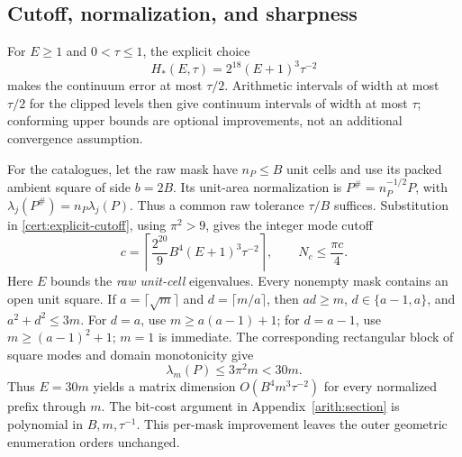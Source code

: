 \documentclass[11pt,reqno]{amsart}
\numberwithin{equation}{section}
\begin{document}
\subsection{Cutoff, normalization, and sharpness}
\label{cert:cutoff}

For $E\ge1$ and $0<\tau\le1$, the explicit choice
\begin{equation}\label{cert:explicit-cutoff}
 H_*(E,\tau)=2^{18}(E+1)^3\tau^{-2}
\end{equation}
makes the continuum error at most $\tau/2$.  Arithmetic intervals
of width at most $\tau/2$ for the clipped levels then give
continuum intervals of width at most $\tau$; conforming upper
bounds are optional improvements, not an additional convergence
assumption.

For the catalogues, let the raw mask have $n_P\le B$ unit cells
and use its packed ambient square of side $b=2B$.  Its unit-area
normalization is $P^\#=n_P^{-1/2}P$, with
$\lambda_j(P^\#)=n_P\lambda_j(P)$.  Thus a common raw tolerance
$\tau/B$ suffices.  Substitution in
\eqref{cert:explicit-cutoff}, using $\pi^2>9$, gives the integer
mode cutoff
\begin{equation}\label{cert:catalogue-cutoff}
 \boxed{\quad
 c=\left\lceil\frac{2^{20}}9
             B^4(E+1)^3\tau^{-2}\right\rceil,\qquad
 N_c\le\frac{\pi c}{4}.
 \quad}
\end{equation}
Here $E$ bounds the \emph{raw unit-cell} eigenvalues.
Every nonempty mask contains an open unit square.  If
$a=\lceil\sqrt m\rceil$ and $d=\lceil m/a\rceil$, then $ad\ge m$,
$d\in\{a-1,a\}$, and $a^2+d^2\le3m$.  For $d=a$, use
$m\ge a(a-1)+1$; for $d=a-1$, use $m\ge(a-1)^2+1$;
$m=1$ is immediate.  The corresponding rectangular block of
square modes and domain monotonicity give
\begin{equation}\label{cert:linear-ceiling}
 \lambda_m(P)\le3\pi^2m<30m .
\end{equation}
Thus $E=30m$ yields a matrix dimension
$O(B^4m^3\tau^{-2})$ for every normalized prefix through $m$.
The bit-cost argument in Appendix~\ref{arith:section} is polynomial
in $B,m,\tau^{-1}$.  This per-mask improvement leaves the outer
geometric enumeration orders unchanged.
\end{document}
